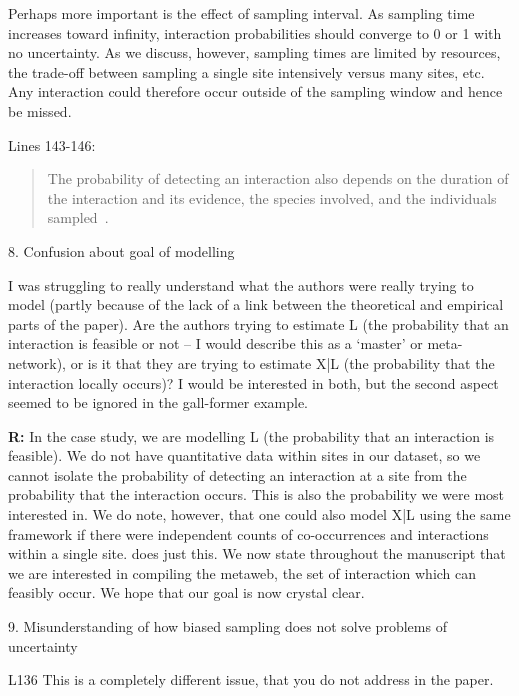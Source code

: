 \documentclass[12pt]{letter}
\newenvironment{refquote}{\bigskip \begin{it}}{\end{it}\smallskip}
\begin{document}
		Perhaps more important is the effect of sampling interval. As sampling time increases toward infinity, interaction probabilities should converge to 0 or 1 with no uncertainty. As we discuss, however, sampling times are limited by resources, the trade-off between sampling a single site intensively versus many sites, etc. Any interaction could therefore occur outside of the sampling window and hence be missed.


		Lines 143-146:


		\begin{quotation}
			The probability of detecting an interaction also depends on the duration of the interaction and its evidence, the species involved, and the individuals sampled~\citep{Wells2013,Lagrue2015,Cirtwill2016,Weinstein2017}. 
		\end{quotation}

	8. Confusion about goal of modelling


		\begin{refquote}
		I was struggling to really understand what the authors were really trying to model (partly because of the lack of a link between the theoretical and empirical parts of the paper). Are the authors trying to estimate L (the probability that an interaction is feasible or not – I would describe this as a `master' or meta- network), or is it that they are trying to estimate X|L (the probability that the interaction locally occurs)? I would be interested in both, but the second aspect seemed to be ignored in the gall-former example.
		\end{refquote}


		\textbf{R:} In the case study, we are modelling L (the probability that an interaction is feasible). We do not have quantitative data within sites in our dataset, so we cannot isolate the probability of detecting an interaction at a site from the probability that the interaction occurs. This is also the probability we were most interested in. We do note, however, that one could also model X|L using the same framework if there were independent counts of co-occurrences and interactions within a single site. \citet{Gravel2018} does just this. We now state throughout the manuscript that we are interested in compiling the metaweb, the set of interaction which can feasibly occur. We hope that our goal is now crystal clear.


	9. Misunderstanding of how biased sampling does not solve problems of uncertainty


		\begin{refquote}
		L136 This is a completely different issue, that you do not address in the paper.
		\end{refquote}
\end{document}
